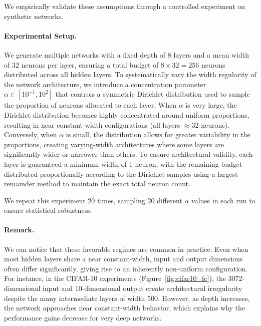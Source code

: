 \documentclass{article}
\theoremstyle{plain}
\theoremstyle{definition}
\theoremstyle{remark}
\begin{document}
We empirically validate these assumptions through a controlled experiment on synthetic networks.

\paragraph{Experimental Setup.}
We generate multiple networks with a fixed depth of 8 layers and a mean width of 32 neurons per layer, ensuring a total budget of $8 \times 32 = 256$ neurons distributed across all hidden layers.
To systematically vary the width regularity of the network architecture, we introduce a concentration parameter $\alpha \in [10^{-1}, 10^{2}]$ that controls a symmetric Dirichlet distribution used to sample the proportion of neurons allocated to each layer.
When $\alpha$ is very large, the Dirichlet distribution becomes highly concentrated around uniform proportions, resulting in near constant-width configurations (all layers $\approx 32$ neurons).
Conversely, when $\alpha$ is small, the distribution allows for greater variability in the proportions, creating varying-width architectures where some layers are significantly wider or narrower than others.
To ensure architectural validity, each layer is guaranteed a minimum width of 1 neuron, with the remaining budget distributed proportionally according to the Dirichlet samples using a largest remainder method to maintain the exact total neuron count.





We repeat this experiment 20 times, sampling 20 different $\alpha$ values in each run to ensure statistical robustness.



\paragraph{Remark.}
We can notice that these favorable regimes are common in practice.
Even when most hidden layers share a near constant-width, input and output dimensions often differ significantly, giving rise to an inherently non-uniform configuration.
For instance, in the CIFAR-10 experiments (Figure~\ref{fig:cifar10_fc}), the 3072-dimensional input and 10-dimensional output create architectural irregularity despite the many intermediate layers of width 500.
However, as depth increases, the network approaches near constant-width behavior, which explains why the performance gains decrease for very deep networks.
\end{document}

